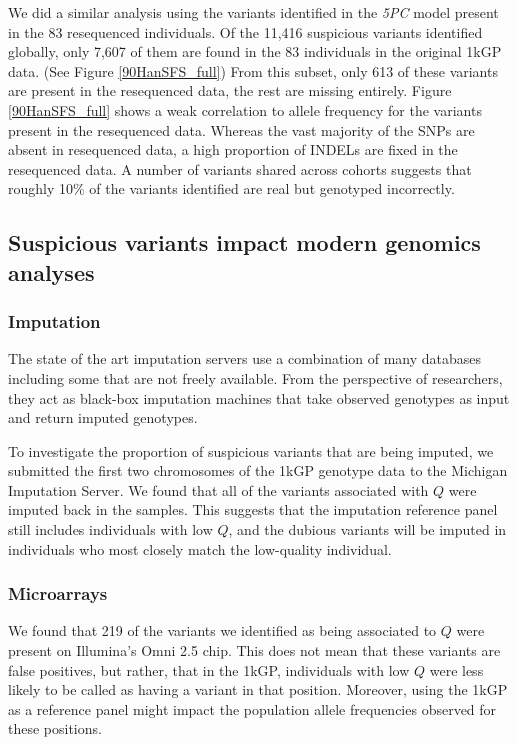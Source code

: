 \documentclass[9pt,lineno]{elife}
\begin{document}
We did a similar analysis using the variants identified in the \textit{5PC} model present in the 83 resequenced individuals.
Of the 11,416 suspicious variants identified globally, only 7,607 of them are found in the 83 individuals in the original 1kGP data. (See Figure \ref{90HanSFS_full})
From this subset, only 613 of these variants are present in the resequenced data, the rest are missing entirely.
Figure \ref{90HanSFS_full} shows a weak correlation to allele frequency for the variants present in the resequenced data.
Whereas the vast majority of the SNPs are absent in resequenced data, a high proportion of INDELs are fixed in the resequenced data.
A number of variants shared across cohorts suggests that roughly 10\% of the variants identified are real but genotyped incorrectly.

\subsection{Suspicious variants impact modern genomics analyses}

\subsubsection{Imputation}

The state of the art imputation servers use a combination of many databases including some that are not freely available.
From the perspective of researchers, they act as black-box imputation machines that take observed genotypes as input and return imputed genotypes.  

To investigate the proportion of suspicious variants that are being imputed, we submitted the first two chromosomes of  the 1kGP genotype data to the Michigan Imputation Server.
We found that all of the variants associated with $Q$ were imputed back in the samples.
This suggests that the imputation reference panel still includes individuals with low $Q$, and the dubious variants will be imputed in individuals who most closely match the low-quality individual.

\subsubsection{Microarrays}

We found that 219 of the variants we identified as being associated to $Q$ were present on Illumina's Omni 2.5 chip. This does not mean that these variants are false positives, but rather, that in the 1kGP, individuals with low $Q$ were less likely to be called as having a variant in that position. Moreover, using the 1kGP as a reference panel might impact the population allele frequencies observed for these positions.
\end{document}
